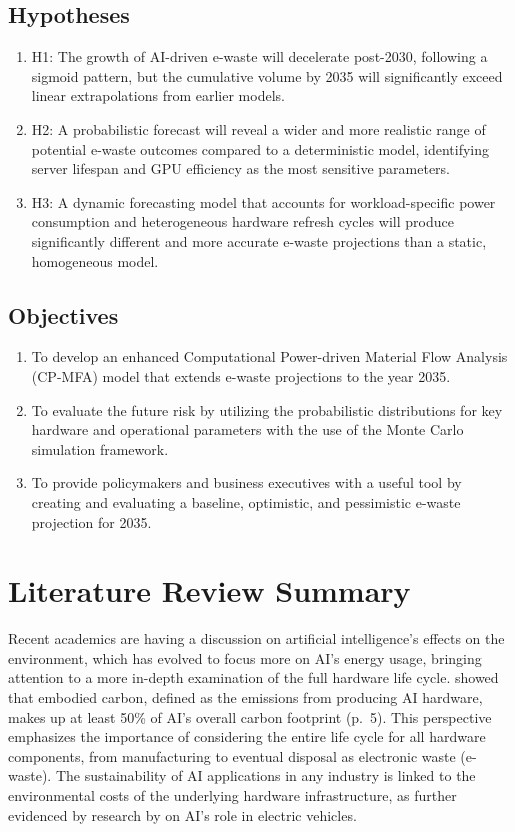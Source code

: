 \documentclass[a4paper, 12pt]{article}
\begin{document}
\subsection*{Hypotheses}
\begin{enumerate}
	\item H1: The growth of AI-driven e-waste will decelerate post-2030, following a sigmoid pattern, but the cumulative volume by 2035 will significantly exceed linear extrapolations from earlier models.
	\item H2: A probabilistic forecast will reveal a wider and more realistic range of potential e-waste outcomes compared to a deterministic model, identifying server lifespan and GPU efficiency as the most sensitive parameters.
	\item H3: A dynamic forecasting model that accounts for workload-specific power consumption and heterogeneous hardware refresh cycles will produce significantly different and more accurate e-waste projections than a static, homogeneous model.
\end{enumerate}

\subsection*{Objectives}
\begin{enumerate}
	\item To develop an enhanced Computational Power-driven Material Flow Analysis (CP-MFA) model that extends e-waste projections to the year 2035.
	\item To evaluate the future risk by utilizing the probabilistic distributions for key hardware and operational parameters with the use of the Monte Carlo simulation framework.
	\item To provide policymakers and business executives with a useful tool by creating and evaluating a baseline, optimistic, and pessimistic e-waste projection for 2035.
\end{enumerate}

\section{Literature Review Summary}
Recent academics are having a discussion on artificial intelligence's effects on the environment, which has evolved to focus more on AI's energy usage, bringing attention to a more in-depth examination of the full hardware life cycle. \citet{Wu2022} showed that embodied carbon, defined as the emissions from producing AI hardware, makes up at least 50\% of AI's overall carbon footprint (p.~5). This perspective emphasizes the importance of considering the entire life cycle for all hardware components, from manufacturing to eventual disposal as electronic waste (e-waste). The sustainability of AI applications in any industry is linked to the environmental costs of the underlying hardware infrastructure, as further evidenced by research by \citet{M.rauf2024} on AI's role in electric vehicles.
\end{document}
